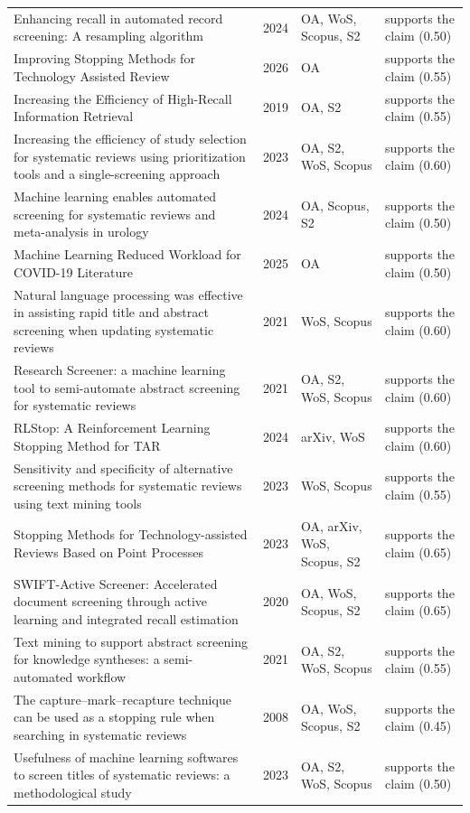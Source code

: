 \begin{longtable}{@{}%
  >{\raggedright\arraybackslash}p{}c%
  >{\raggedright\arraybackslash}p{}%
  >{\raggedright\arraybackslash}p{}@{}}
Enhancing recall in automated record screening: A resampling algorithm & 2024 & OA, WoS, Scopus, S2 & supports the claim (0.50) \\
Improving Stopping Methods for Technology Assisted Review & 2026 & OA & supports the claim (0.55) \\
Increasing the Efficiency of High-Recall Information Retrieval & 2019 & OA, S2 & supports the claim (0.55) \\
Increasing the efficiency of study selection for systematic reviews using prioritization tools and a single-screening approach & 2023 & OA, S2, WoS, Scopus & supports the claim (0.60) \\
Machine learning enables automated screening for systematic reviews and meta-analysis in urology & 2024 & OA, Scopus, S2 & supports the claim (0.50) \\
Machine Learning Reduced Workload for COVID-19 Literature & 2025 & OA & supports the claim (0.50) \\
Natural language processing was effective in assisting rapid title and abstract screening when updating systematic reviews & 2021 & WoS, Scopus & supports the claim (0.60) \\
Research Screener: a machine learning tool to semi-automate abstract screening for systematic reviews & 2021 & OA, S2, WoS, Scopus & supports the claim (0.60) \\
RLStop: A Reinforcement Learning Stopping Method for TAR & 2024 & arXiv, WoS & supports the claim (0.60) \\
Sensitivity and specificity of alternative screening methods for systematic reviews using text mining tools & 2023 & WoS, Scopus & supports the claim (0.55) \\
Stopping Methods for Technology-assisted Reviews Based on Point Processes & 2023 & OA, arXiv, WoS, Scopus, S2 & supports the claim (0.65) \\
SWIFT-Active Screener: Accelerated document screening through active learning and integrated recall estimation & 2020 & OA, WoS, Scopus, S2 & supports the claim (0.65) \\
Text mining to support abstract screening for knowledge syntheses: a semi-automated workflow & 2021 & OA, S2, WoS, Scopus & supports the claim (0.55) \\
The capture--mark--recapture technique can be used as a stopping rule when searching in systematic reviews & 2008 & OA, WoS, Scopus, S2 & supports the claim (0.45) \\
Usefulness of machine learning softwares to screen titles of systematic reviews: a methodological study & 2023 & OA, S2, WoS, Scopus & supports the claim (0.50) \\

\end{longtable}
